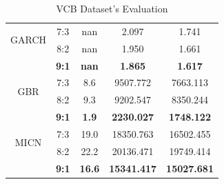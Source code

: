 \documentclass{ieeeojies}
\begin{document}
\begin{table}[H]
\begin{tabular}{|c|c|c|c|c|}
         \hline
         \multirow{2}{*}{GARCH} & 7:3 & nan & 2.097 & 1.741 \\ 
            & 8:2 & nan & 1.950 & 1.661 \\
            & \textbf{9:1} & \textbf{nan} & \textbf{1.865} & \textbf{1.617} \\
         \hline
       \multirow{2}{*}{GBR} & 7:3 & 8.6 & 9507.772 & 7663.113 \\ 
            & 8:2 & 9.3 & 9202.547 & 8350.244 \\ 
            & \textbf{9:1} & \textbf{1.9} & \textbf{2230.027} & \textbf{1748.122} \\
         \hline
        \multirow{2}{*}{MICN} & 7:3 & 19.0 & 18350.763 & 16502.455 \\ 
            & 8:2 & 22.2 & 20136.471 & 19749.414 \\ 
            & \textbf{9:1} & \textbf{16.6} & \textbf{15341.417} & \textbf{15027.681} \\
         \hline
    \end{tabular}
    \caption{VCB Dataset's Evaluation}
    \label{vcbresult}
\end{table}
\end{document}
